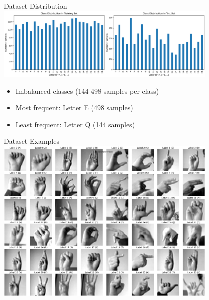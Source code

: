 \documentclass{beamer}
\begin{document}
\begin{frame}{Dataset Distribution}
\centering
\includegraphics[width=0.8\textwidth]{dataset_distribution.png}
\begin{itemize}
    \item  \begin{center} Imbalanced classes (144-498 samples per class) \end{center}
    \item  \begin{center} Most frequent: Letter E (498 samples)
    \end{center}
    \item  \begin{center} Least frequent: Letter Q (144 samples)
    \end{center}
\end{itemize}
\end{frame}

\begin{frame}{Dataset Examples}
\centering
\includegraphics[width=0.8\textwidth]{dataset_items.png}
\end{frame}
\end{document}
